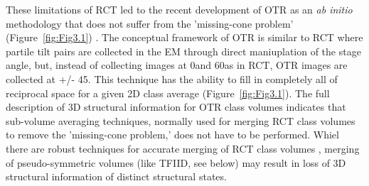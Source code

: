 \indent  These limitations of RCT led to the recent development of OTR as an \emph{ab initio} methodology that does not suffer from the 'missing-cone problem' (Figure~\ref{fig:Fig3.1}) \cite{Leschziner_1228,Leschziner_452}. The conceptual framework of OTR is similar to RCT where partile tilt pairs are collected in the EM through direct maniuplation of the stage angle, but, instead of collecting images at 0\textdegree and 60\textdegree as in RCT, OTR images are collected at +/- 45\textdegree. This technique has the ability to fill in completely all of reciprocal space for a given 2D class average (Figure~\ref{fig:Fig3.1}). The full description of 3D structural information for OTR class volumes indicates that sub-volume averaging techniques, normally used for merging RCT class volumes to remove the 'missing-cone problem,' does not have to be performed. Whiel there are robust techniques for accurate merging of RCT class volumes \cite{Scheres_2009}, merging of pseudo-symmetric volumes (like TFIID, see below) may result in loss of 3D structural information of distinct structural states. \\

